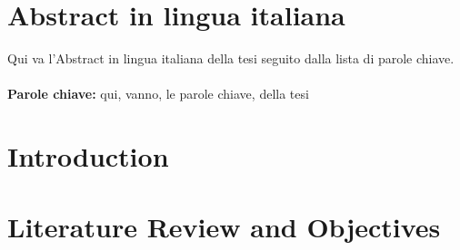 \documentclass{polimi_template_classic/PoliMi3i_thesis}
\begin{document}
\chapter*{Abstract in lingua italiana}
Qui va l'Abstract in lingua italiana della tesi seguito dalla lista di parole chiave.
\\
\\
\textbf{Parole chiave:} qui, vanno, le parole chiave, della tesi %


\thispagestyle{empty}
\tableofcontents %
\thispagestyle{empty}
\cleardoublepage

%
%
%    
%

\mainmatter %

\chapter*{Introduction} 


\chapter{Literature Review and Objectives} %


\end{document}
